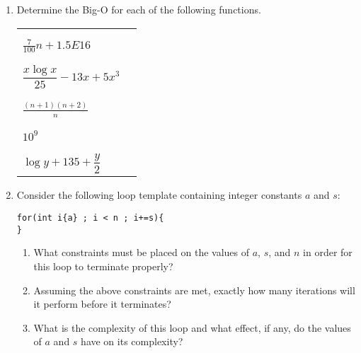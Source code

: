 \documentclass[10pt]{article}
\begin{document}
\begin{enumerate}
\item Determine the Big-O for each of the following functions.
\begin{center}
\begin{tabular}{lc}
 & \\ & \\
$\frac{7}{100}n+1.5E16$ & \underline{\hspace{1.5in}} \\
& \\ & \\
$\dfrac{x\log x}{25} - 13x + 5x^3$ & \underline{\hspace{1.5in}} \\
& \\ & \\
$\frac{(n+1)(n+2)}{n}$ & \underline{\hspace{1.5in}} \\
& \\ & \\
$10^9$ & \underline{\hspace{1.5in}} \\
& \\ & \\
$\log y + 135 + \dfrac{y}{2}$ & \underline{\hspace{1.5in}} \\
\end{tabular}
\end{center}

\newpage \thispagestyle{empty}

\item Consider the following loop template containing integer constants $a$ and $s$:
\begin{center}
\begin{lstlisting}
for(int i{a} ; i < n ; i+=s){
}
\end{lstlisting}
\end{center}
\begin{enumerate}
  \item What constraints must be placed on the values of $a$, $s$, and $n$ in order for this loop to terminate properly?
  \vspace{2in}
  \item Assuming the above constraints are met, exactly how many iterations will it perform before it terminates?
  \vspace{2in}
  \item What is the complexity of this loop and what effect, if any, do the values of $a$ and $s$ have on its complexity?
  \newpage \thispagestyle{empty}
\end{enumerate}


\end{enumerate}
\end{document}
